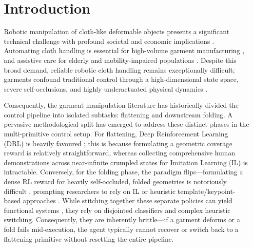 \documentclass[journal]{IEEEtran}
\begin{document}
\section{Introduction}

Robotic manipulation of cloth-like deformable objects presents a significant technical challenge with profound societal and economic implications \cite{kadi2023data}. Automating cloth handling is essential for high-volume garment manufacturing \cite{nayak2018introduction}, and assistive care for elderly and mobility-impaired populations \cite{ohneberg2023assistive}. Despite this broad demand, reliable robotic cloth handling remains exceptionally difficult; garments confound traditional control through a high-dimensional state space, severe self-occlusions, and highly underactuated physical dynamics \cite{xue2023unifolding}.

Consequently, the garment manipulation literature has historically divided the control pipeline into isolated subtasks: flattening and downstream folding. A pervasive methodological split has emerged to address these distinct phases in the multi-primitive control setup. For flattening, Deep Reinforcement Learning (DRL) is heavily favoured \cite{canberk2022cloth, avigal2022speedfolding, ha2022flingbot}; this is because formulating a geometric coverage reward is relatively straightforward, whereas collecting comprehensive human demonstrations across near-infinite crumpled states for Imitation Learning (IL) is intractable. Conversely, for the folding phase, the paradigm flips---formulating a dense RL reward for heavily self-occluded, folded geometries is notoriously difficult \cite{kadi2025lagarnet}, prompting researchers to rely on IL or heuristic template/keypoint-based approaches \cite{barbany2025bifold}. While stitching together these separate policies can yield functional systems \cite{avigal2022speedfolding, canberk2022cloth, xue2023unifolding}, they rely on disjointed classifiers and complex heuristic switching. Consequently, they are inherently brittle---if a garment deforms or a fold fails mid-execution, the agent typically cannot recover or switch back to a flattening primitive without resetting the entire pipeline.
\end{document}
